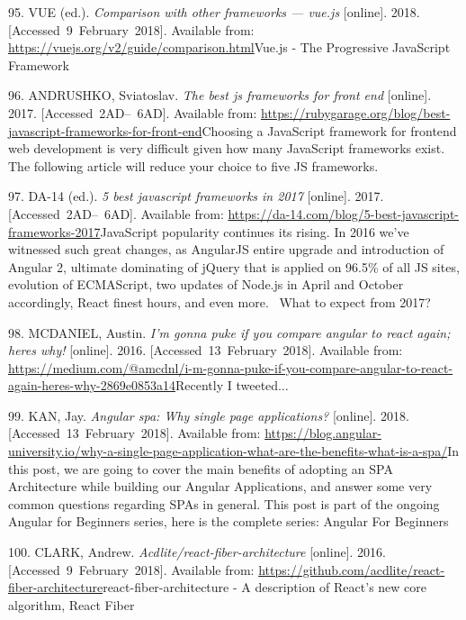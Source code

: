 \documentclass[american,a4paper,oneside,,tablecaptionabove]{scrbook}
\begin{document}
\hypertarget{ref-Vue.2018}{}
95. VUE (ed.). \emph{Comparison with other frameworks --- vue.js}
{[}online{]}. 2018. {[}Accessed~9~February~2018{]}. Available from:
\url{https://vuejs.org/v2/guide/comparison.html}Vue.js - The Progressive
JavaScript Framework

\hypertarget{ref-Andrushko.2017}{}
96. ANDRUSHKO, Sviatoslav. \emph{The best js frameworks for front end}
{[}online{]}. 2017. {[}Accessed~2AD--~6AD{]}. Available from:
\url{https://rubygarage.org/blog/best-javascript-frameworks-for-front-end}Choosing
a JavaScript framework for frontend web development is very difficult
given how many JavaScript frameworks exist. The following article will
reduce your choice to five JS frameworks.

\hypertarget{ref-DA14.2017}{}
97. DA-14 (ed.). \emph{5 best javascript frameworks in 2017}
{[}online{]}. 2017. {[}Accessed~2AD--~6AD{]}. Available from:
\url{https://da-14.com/blog/5-best-javascript-frameworks-2017}JavaScript
popularity continues its rising. In 2016 we've witnessed such great
changes, as AngularJS entire upgrade and introduction of Angular 2,
ultimate dominating of jQuery that is applied on 96.5\% of all JS sites,
evolution of ECMAScript, two updates of Node.js in April and October
accordingly, React finest hours, and even more. ~What to expect from
2017?

\hypertarget{ref-McDaniel.2016}{}
98. MCDANIEL, Austin. \emph{I'm gonna puke if you compare angular to
react again; heres why!} {[}online{]}. 2016.
{[}Accessed~13~February~2018{]}. Available from:
\url{https://medium.com/@amcdnl/i-m-gonna-puke-if-you-compare-angular-to-react-again-heres-why-2869e0853a14}Recently
I tweeted\(\ldots\)

\hypertarget{ref-Kan.2018}{}
99. KAN, Jay. \emph{Angular spa: Why single page applications?}
{[}online{]}. 2018. {[}Accessed~13~February~2018{]}. Available from:
\url{https://blog.angular-university.io/why-a-single-page-application-what-are-the-benefits-what-is-a-spa/}In
this post, we are going to cover the main benefits of adopting an SPA
Architecture while building our Angular Applications, and answer some
very common questions regarding SPAs in general. This post is part of
the ongoing Angular for Beginners series, here is the complete series:
Angular For Beginners

\hypertarget{ref-Clark.2016}{}
100. CLARK, Andrew. \emph{Acdlite/react-fiber-architecture}
{[}online{]}. 2016. {[}Accessed~9~February~2018{]}. Available from:
\url{https://github.com/acdlite/react-fiber-architecture}react-fiber-architecture
- A description of React's new core algorithm, React Fiber
\end{document}
